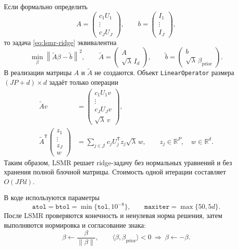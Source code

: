 Если формально определить
\[
 A=
 \begin{pmatrix}
  c_1U_1\\
  \vdots\\
  c_JU_J
 \end{pmatrix},
 \qquad
 b=
 \begin{pmatrix}
  I_1\\
  \vdots\\
  I_J
 \end{pmatrix},
\]
то задача \eqref{eq:lsmr-ridge} эквивалентна
\[
 \min_\beta
 \left\|
 \widetilde A\beta-\widetilde b
 \right\|^2,
 \qquad
 \widetilde A=
 \begin{pmatrix}
  A\\
  \sqrt{\lambda}\,I_d
 \end{pmatrix},
 \qquad
 \widetilde b=
 \begin{pmatrix}
  b\\
  \sqrt{\lambda}\,\beta_{\mathrm{prior}}
 \end{pmatrix}.
\]
В реализации матрицы \(A\) и \(\widetilde A\) не создаются.
Объект \texttt{LinearOperator} размера
\((JP+d)\times d\) задаёт только операции
\begin{align}
 \widetilde A v
 &=
 \begin{pmatrix}
  c_1U_1v\\
  \vdots\\
  c_JU_Jv\\
  \sqrt{\lambda}\,v
 \end{pmatrix},
 \label{eq:lsmr-matvec}\\
 \widetilde A^{\mathsf T}
 \begin{pmatrix}
  z_1\\
  \vdots\\
  z_J\\
  w
 \end{pmatrix}
 &=
 \sum_{j\in\mathcal J}c_jU_j^{\mathsf T}z_j
 \sqrt{\lambda}\,w,
 \qquad
 z_j\in\mathbb R^P,\quad w\in\mathbb R^d.
 \label{eq:lsmr-rmatvec}
\end{align}
Таким образом, LSMR решает ridge-задачу без нормальных уравнений и без
хранения полной блочной матрицы. Стоимость одной итерации составляет
\(O(JPd)\).

В коде используются параметры
\[
 \texttt{atol}=\texttt{btol}
 =\min\{\texttt{tol},10^{-8}\},
 \qquad
 \texttt{maxiter}=\max\{50,5d\}.
\]
После LSMR проверяются конечность и ненулевая норма решения, затем выполняются
нормировка и согласование знака:
\[
 \beta\leftarrow\frac{\beta}{\|\beta\|},
 \qquad
 \langle\beta,\beta_{\mathrm{prior}}\rangle<0
 \ \Longrightarrow\
 \beta\leftarrow-\beta.
\]

